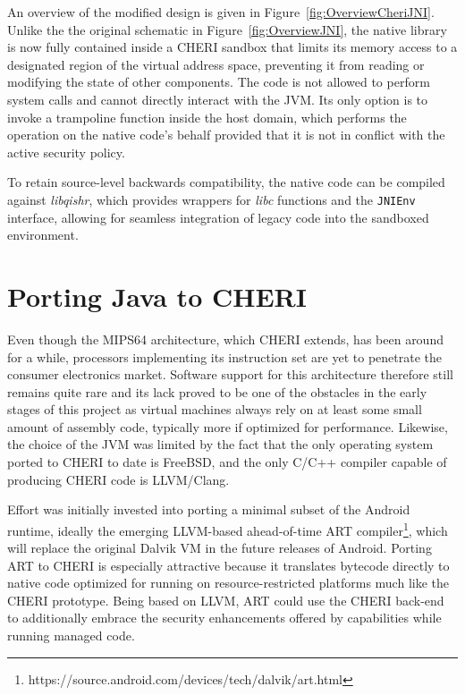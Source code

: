 \documentclass[a4paper,12pt,twoside,openright]{report}
\newcommand{\tool}[1]{\emph{#1}}
\newcommand{\lib}[1]{\tool{lib#1}}
\begin{document}
An overview of the modified design is given in Figure~\ref{fig:OverviewCheriJNI}. Unlike the the original schematic in Figure~\ref{fig:OverviewJNI}, the native library is now fully contained inside a CHERI sandbox that limits its memory access to a designated region of the virtual address space, preventing it from reading or modifying the state of other components. The code is not allowed to perform system calls and cannot directly interact with the JVM. Its only option is to invoke a trampoline function inside the host domain, which performs the operation on the native code's behalf provided that it is not in conflict with the active security policy.

To retain source-level backwards compatibility, the native code can be compiled against \lib{qishr}, which provides wrappers for \lib{c} functions and the \texttt{JNIEnv} interface, allowing for seamless integration of legacy code into the sandboxed environment.

\section{Porting Java to CHERI}

Even though the MIPS64 architecture, which CHERI extends, has been around for a while, processors implementing its instruction set are yet to penetrate the consumer electronics market. Software support for this architecture therefore still remains quite rare and its lack proved to be one of the obstacles in the early stages of this project as virtual machines always rely on at least some small amount of assembly code, typically more if optimized for performance. Likewise, the choice of the JVM was limited by the fact that the only operating system ported to CHERI to date is FreeBSD, and the only C/C++ compiler capable of producing CHERI code is LLVM/Clang. 

Effort was initially invested into porting a minimal subset of the Android runtime, ideally the emerging LLVM-based ahead-of-time ART compiler\footnote{https://source.android.com/devices/tech/dalvik/art.html}, which will replace the original Dalvik VM in the future releases of Android. Porting ART to CHERI is especially attractive because it translates bytecode directly to native code optimized for running on resource-restricted platforms much like the CHERI prototype. Being based on LLVM, ART could use the CHERI back-end to additionally embrace the security enhancements offered by capabilities while running managed code.
\end{document}
